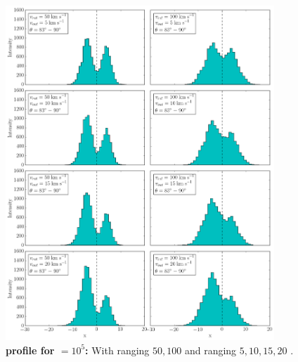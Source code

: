\begin{figure}[h!]
	\begin{center}
		\includegraphics[width=0.9\textwidth]{./figures/chapter3/3_tau10E5_phi83-90}
	\end{center}
	\caption{\textbf{\lya profile for \tauh$=10^5$:} With \vrot ranging $50,100$ \kms and \vout ranging $5,10,15,20$ \kms.
		\label{fig:3_tau10E5_phi83-90}}
\end{figure}

\newpage

